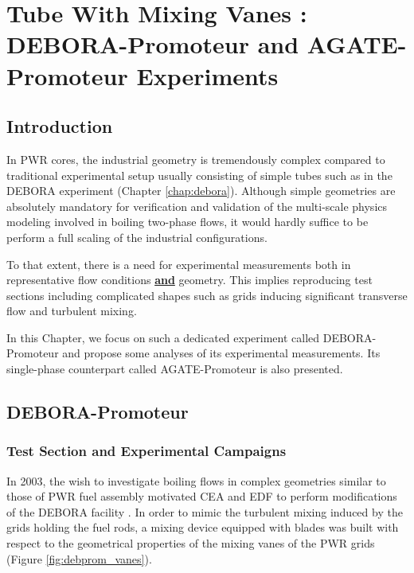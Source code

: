 
\chapter{Tube With Mixing Vanes : DEBORA-Promoteur and AGATE-Promoteur Experiments} %

\minitoc

\label{chap:debora_agate_prom} %

\section{Introduction}

In PWR cores, the industrial geometry is tremendously complex compared to traditional experimental setup usually consisting of simple tubes such as in the DEBORA experiment (Chapter \ref{chap:debora}). Although simple geometries are absolutely mandatory for verification and validation of the multi-scale physics modeling involved in boiling two-phase flows, it would hardly suffice to be perform a full scaling of the industrial configurations. 

\npar

To that extent, there is a need for experimental measurements both in representative flow conditions \textbf{\underline{and}} geometry. This implies reproducing test sections including complicated shapes such as grids inducing significant transverse flow and turbulent mixing. 

\npar

In this Chapter, we focus on such a dedicated experiment called DEBORA-Promoteur and propose some analyses of its experimental measurements. Its single-phase counterpart called AGATE-Promoteur is also presented.



\section{DEBORA-Promoteur}
\label{sec:deb_prom_desc}

\subsection{Test Section and Experimental Campaigns}

In 2003, the wish to investigate boiling flows in complex geometries similar to those of PWR fuel assembly motivated CEA and EDF to perform modifications of the DEBORA facility \cite{falk_rapport_2002}. In order to mimic the turbulent mixing induced by the grids holding the fuel rods, a mixing device equipped with blades was built with respect to the geometrical properties of the mixing vanes of the PWR grids (Figure \ref{fig:debprom_vanes}).


